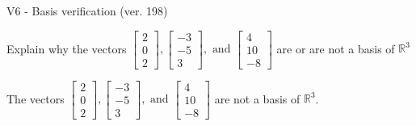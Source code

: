 \begin{exercise}
  \begin{exerciseTitle}V6 - Basis verification (ver. 198)\end{exerciseTitle}
  \begin{exerciseStatement}
    Explain why the vectors \(\left[\begin{array}{r}
2 \\
0 \\
2
\end{array}\right] , \left[\begin{array}{r}
-3 \\
-5 \\
3
\end{array}\right] , \text{ and } \left[\begin{array}{r}
4 \\
10 \\
-8
\end{array}\right]\) are or are not a basis of \(\mathbb{R}^3\)	


  \end{exerciseStatement}
  \begin{exerciseAnswer}
   The vectors \(\left[\begin{array}{r}
2 \\
0 \\
2
\end{array}\right] , \left[\begin{array}{r}
-3 \\
-5 \\
3
\end{array}\right] , \text{ and } \left[\begin{array}{r}
4 \\
10 \\
-8
\end{array}\right]\) 
  	 are not  a basis of \(\mathbb{R}^3\).
  


  \end{exerciseAnswer}
\end{exercise}